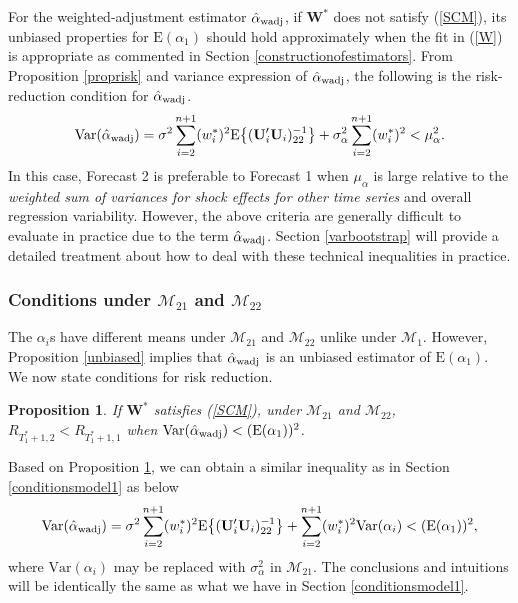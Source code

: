\documentclass[11pt]{article}
\def\mbf#1{\mathbf{#1}} %
\def\mrm#1{\mathrm{#1}} %
\def\mc#1{\mathcal{#1}} %
\def\E#1{\mathrm{E}(#1)} %
\def\var#1{\mathrm{Var}(#1)} %
\newtheorem{prop}{Proposition}
\theoremstyle{definition}
\begin{document}
For the weighted-adjustment estimator $\hat{\alpha}_{\rm wadj}$, if  $\mathbf{W}^*$ does not satisfy (\ref{SCM}), its unbiased properties for $\E{\alpha_1}$ should hold approximately when the fit in (\ref{W}) is appropriate as commented in Section \ref{constructionofestimators}. From Proposition \ref{proprisk} and variance expression of $\hat{\alpha}_{\rm wadj}$, the following is the risk-reduction condition for $\hat{\alpha}_{\rm wadj}$.
\begin{align*}
\var{\hat{\alpha}_{\rm wadj}}
 = \sigma^2\sum_{i=2}^{n+1}(w_i^*)^2\mrm{E}\big\{(\mbf{U}'_i\mbf{U}_i)^{-1}_{22}\big\}+\sigma^2_{\alpha}\sum_{i=2}^{n+1}(w_i^*)^2 < \mu_{\alpha}^2.
\end{align*}
In this case, Forecast 2 is preferable to Forecast 1 when $\mu_{\alpha}$ is large relative to the \emph{weighted sum of variances for shock effects for other time series} and overall regression variability.  However, the above criteria are generally difficult to evaluate in practice due to the term $\hat{\alpha}_{\rm wadj}$. Section  \ref{varbootstrap} will provide a detailed treatment about how to deal with these technical inequalities in practice.


\subsubsection{Conditions under $\mc{M}_{21}$ and $\mc{M}_{22}$}
\label{conditionsm2122}
The $\alpha_i$s have different means under $\mc{M}_{21}$ and $\mc{M}_{22}$ unlike under $\mc{M}_1$. %
However, Proposition \ref{unbiased} implies that $\hat{\alpha}_{\rm wadj}$ is an unbiased estimator of $\E{\alpha_1}$. %
We now state conditions for risk reduction.

\begin{prop}
\label{propriskwadj2} If $\mbf{W}^*$ satisfies (\ref{SCM}), under $\mc{M}_{21}$ and $\mc{M}_{22}$, $R_{T_1^*+1,2}<R_{T_1^*+1,1}$ when $\var{\hat{\alpha}_{\rm wadj}}<(\E{\alpha_1})^2$. 
\end{prop}

Based on Proposition \ref{propriskwadj2}, we can obtain a similar inequality as in Section \ref{conditionsmodel1} as below
\begin{align*}
\var{\hat{\alpha}_{\rm wadj}}
 = \sigma^2\sum_{i=2}^{n+1}(w_i^*)^2\mrm{E}\big\{(\mbf{U}'_i\mbf{U}_i)^{-1}_{22}\big\} + \sum_{i=2}^{n+1} (w_i^*)^2 \var{\alpha_i} < (\E{\alpha_1})^2,
\end{align*}
where $\var{\alpha_i}$ may be replaced with $\sigma^2_{\alpha}$ in $\mc{M}_{21}$. The conclusions and intuitions will be identically the same as what we have in Section \ref{conditionsmodel1}. 
\end{document}

